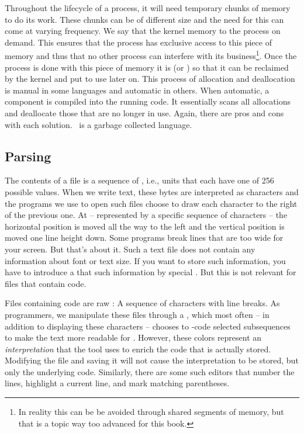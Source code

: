 Throughout the lifecycle of a process, it will need temporary chunks of memory to do its work. These chunks can be of different size and the need for this can come at varying frequency. We say that the kernel  memory to the process on demand. This ensures that the process has exclusive access to this piece of memory and thus that no other process can interfere with its business\footnote{In reality this can be be avoided through shared segments of memory, but that is a topic way too advanced for this book.}. Once the process is done with this piece of memory it is  (or ) so that it can be reclaimed by the kernel and put to use later on. This process of allocation and deallocation is manual in some languages and automatic in others. When automatic, a  component is compiled into the running code. It essentially scans all allocations and deallocate those that are no longer in use. Again, there are pros and cons with each solution. \csharp\ is a garbage collected language.

\subsection{Parsing}

The contents of a file is a sequence of , i.e., units that each have one of 256 possible values. When we write text, these bytes are interpreted as characters and the programs we use to open such files choose to draw each character to the right of the previous one. At  -- represented by a specific sequence of characters -- the horizontal position is moved all the way to the left and the vertical position is moved one line height down. Some programs break lines that are too wide for your screen. But that's about it. Such a text file does not contain any information about font or text size. If you want to store such information, you have to introduce a  that  such information by special . But this is not relevant for files that contain code.

Files containing code are raw : A sequence of characters with line breaks. As programmers, we manipulate these files through a , which most often -- in addition to displaying these characters -- chooses to -code selected subsequences to make the text more readable for . However, these colors represent an \textsl{interpretation} that the tool uses to enrich the code that is actually stored. Modifying the file and saving it will not cause the interpretation to be stored, but only the underlying code. Similarly, there are some such editors that number the lines, highlight a current line, and mark matching parentheses.

